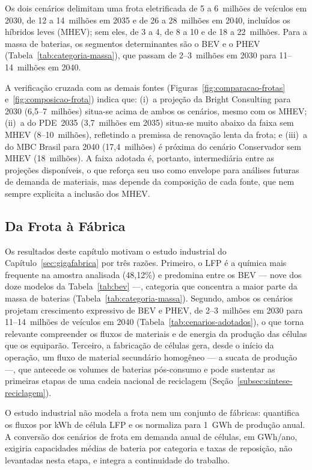 Os dois cenários delimitam uma frota eletrificada de 5 a 6~milhões de veículos em
2030, de 12 a 14~milhões em 2035 e de 26 a 28~milhões em 2040, incluídos os
híbridos leves (MHEV); sem eles, de 3 a 4, de 8 a 10 e de 18 a 22~milhões. Para a
massa de baterias, os segmentos determinantes são o BEV e o PHEV
(Tabela~\ref{tab:categoria-massa}), que passam de 2--3~milhões em 2030 para
11--14~milhões em 2040.

A verificação cruzada com as demais fontes
(Figuras~\ref{fig:comparacao-frotas} e~\ref{fig:composicao-frota}) indica que:
(i)~a projeção da Bright Consulting para 2030 (6,5--7~milhões) situa-se acima de
ambos os cenários, mesmo com os MHEV; (ii)~a do PDE~2035 (3,7~milhões em 2035)
situa-se muito abaixo da faixa sem MHEV (8--10~milhões), refletindo a premissa de
renovação lenta da frota; e (iii)~a do MBC Brasil para 2040 (17,4~milhões) é
próxima do cenário Conservador sem MHEV (18~milhões). A faixa adotada é, portanto,
intermediária entre as projeções disponíveis, o que reforça seu uso como envelope
para análises futuras de demanda de materiais, mas depende da composição de cada
fonte, que nem sempre explicita a inclusão dos MHEV.

\subsection{Da Frota à Fábrica}
\label{sec:frota-fabrica}

Os resultados deste capítulo motivam o estudo industrial do
Capítulo~\ref{sec:gigafabrica} por três razões. Primeiro, o LFP é a química mais
frequente na amostra analisada (48,12\%) e predomina entre os BEV — nove dos doze
modelos da Tabela~\ref{tab:bev} —, categoria que concentra a maior parte da massa
de baterias (Tabela~\ref{tab:categoria-massa}). Segundo, ambos os cenários
projetam crescimento expressivo de BEV e PHEV, de 2--3~milhões em 2030 para
11--14~milhões de veículos em 2040 (Tabela~\ref{tab:cenarios-adotados}), o que
torna relevante compreender os fluxos de materiais e de energia da produção das
células que os equiparão. Terceiro, a fabricação de células gera, desde o início
da operação, um fluxo de material secundário homogêneo — a sucata de produção —,
que antecede os volumes de baterias pós-consumo e pode sustentar as primeiras
etapas de uma cadeia nacional de reciclagem
(Seção~\ref{subsec:sintese-reciclagem}).

O estudo industrial não modela a frota nem um conjunto de fábricas: quantifica os
fluxos por kWh de célula LFP e os normaliza para 1~GWh de produção anual. A
conversão dos cenários de frota em demanda anual de células, em GWh/ano, exigiria
capacidades médias de bateria por categoria e taxas de reposição, não levantadas
nesta etapa, e integra a continuidade do trabalho.
